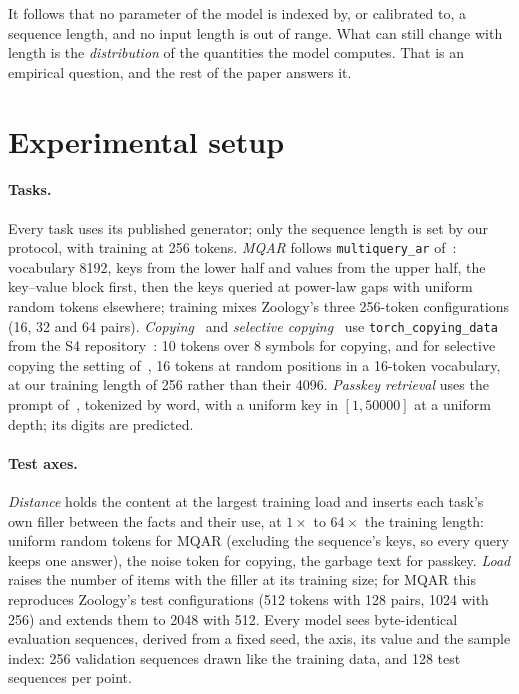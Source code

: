 \documentclass[11pt]{article}
\begin{document}
It follows that no parameter of the model is indexed by, or calibrated to, a
sequence length, and no input length is out of range. What can still change with
length is the \emph{distribution} of the quantities the model computes. That is an
empirical question, and the rest of the paper answers it.

\section{Experimental setup}
\label{sec:setup}

\paragraph{Tasks.} Every task uses its published generator; only the sequence length
is set by our protocol, with training at 256 tokens. \emph{MQAR} follows \texttt{multiquery\_ar} of~\citet{arora2024zoology}:
vocabulary 8192, keys from the lower half and values from the upper half, the
key--value block first, then the keys queried at power-law gaps with uniform random
tokens elsewhere; training mixes Zoology's three 256-token configurations (16, 32
and 64 pairs). \emph{Copying}~\citep{arjovsky2016unitary} and \emph{selective
copying}~\citep{gu2023mamba} use \texttt{torch\_copying\_data} from the S4
repository~\citep{gu2022efficiently}: 10 tokens over 8 symbols for copying, and
for selective copying the setting of~\citet{gu2023mamba}, 16 tokens at random
positions in a 16-token vocabulary, at our training length of 256 rather than their
4096. \emph{Passkey retrieval} uses the prompt
of~\citet{mohtashami2023landmark}, tokenized by word, with a uniform key in
$[1,50000]$ at a uniform depth; its digits are predicted.

\paragraph{Test axes.} \emph{Distance} holds the content at the largest training load
and inserts each task's own filler between the facts and their use, at $1\times$ to
$64\times$ the training length: uniform random tokens for MQAR
(excluding the sequence's keys, so every query keeps one answer), the noise token for
copying, the garbage text for passkey. \emph{Load} raises the number of items with
the filler at its training size; for MQAR this reproduces Zoology's test
configurations (512 tokens with 128 pairs, 1024 with 256) and extends them to 2048
with 512. Every model sees byte-identical evaluation sequences, derived from a fixed
seed, the axis, its value and the sample index: 256 validation sequences drawn like
the training data, and 128 test sequences per point.
\end{document}

